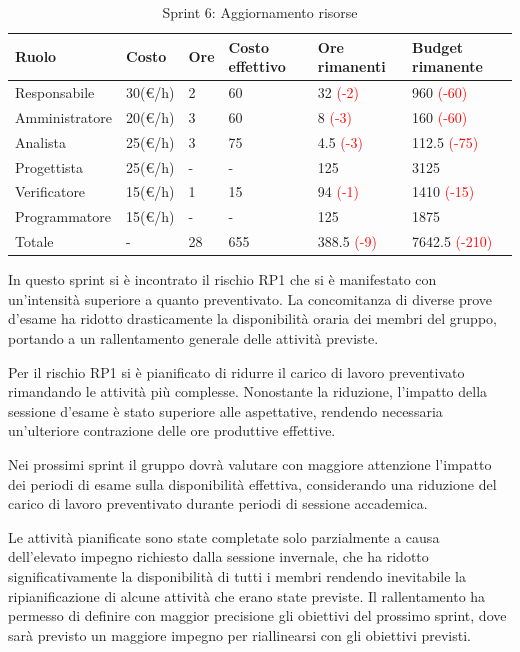 \begin{table}[H]
	\centering
	\begin{tabular}{|p{}|p{}|p{}|p{}|p{}|p{}|}
		\hline
		\rowcolor{gray!25}
		Ruolo & Costo & Ore & Costo \newline effettivo & Ore \newline rimanenti & Budget \newline rimanente \\ \hline
		Responsabile       & 30(€/h) & 2 & 60 & 32 \textcolor{red}{(-2)} & 960 \textcolor{red}{(-60)} \\ \hline
		Amministratore & 20(€/h) & 3 & 60 & 8 \textcolor{red}{(-3)} & 160 \textcolor{red}{(-60)} \\ \hline
		Analista       & 25(€/h) & 3 & 75 & 4.5 \textcolor{red}{(-3)} & 112.5 \textcolor{red}{(-75)}\\ \hline
		Progettista    & 25(€/h) & - & - & 125 & 3125 \\ \hline
		Verificatore   & 15(€/h) & 1 & 15 & 94 \textcolor{red}{(-1)} & 1410 \textcolor{red}{(-15)} \\ \hline
		Programmatore  & 15(€/h) & - & - & 125 & 1875 \\ \hline
		Totale         & - & 28 & 655 & 388.5 \textcolor{red}{(-9)} & 7642.5 \textcolor{red}{(-210)}\\ \hline
	\end{tabular}
	\caption{Sprint 6: Aggiornamento risorse}
\end{table}


In questo sprint si è incontrato il rischio RP1 che si è manifestato con un'intensità superiore a quanto preventivato. 
La concomitanza di diverse prove d'esame ha ridotto drasticamente la disponibilità oraria dei membri del gruppo, portando a un rallentamento generale delle attività previste.

Per il rischio RP1 si è pianificato di ridurre il carico di lavoro preventivato rimandando le attività più complesse. 
Nonostante la riduzione, l'impatto della sessione d'esame è stato superiore alle aspettative, rendendo necessaria un'ulteriore contrazione delle ore produttive effettive. 

Nei prossimi sprint il gruppo dovrà valutare con maggiore attenzione l'impatto dei periodi di esame sulla disponibilità effettiva, considerando una riduzione del carico di lavoro preventivato durante periodi di sessione accademica.

Le attività pianificate sono state completate solo parzialmente a causa dell'elevato impegno richiesto dalla sessione invernale, che ha ridotto significativamente la disponibilità di tutti i membri rendendo inevitabile la ripianificazione di alcune attività che erano state previste.
Il rallentamento ha permesso di definire con maggior precisione gli obiettivi del prossimo sprint, dove sarà previsto un maggiore impegno per riallinearsi con gli obiettivi previsti.